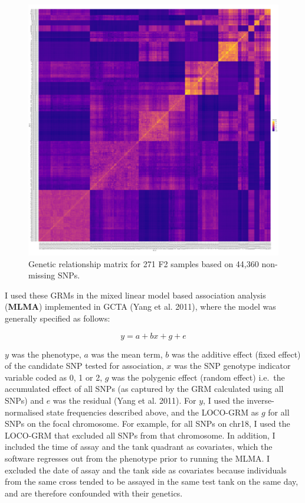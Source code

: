 \documentclass[
]{book}
\begin{document}
\begin{figure}
\includegraphics[width=1\linewidth]{figs/mikk_behaviour/grm_man_0.8} \caption{Genetic relationship matrix for 271 F2 samples based on 44,360 non-missing SNPs.}\label{fig:F2-grm}
\end{figure}

I used these GRMs in the mixed linear model based association analysis (\textbf{MLMA}) implemented in GCTA (Yang et al. 2011), where the model was generally specified as follows:

\[
y = a + bx + g + e
\]

\(y\) was the phenotype, \(a\) was the mean term, \(b\) was the additive effect (fixed effect) of the candidate SNP tested for association, \(x\) was the SNP genotype indicator variable coded as 0, 1 or 2, \(g\) was the polygenic effect (random effect) i.e.~the accumulated effect of all SNPs (as captured by the GRM calculated using all SNPs) and \(e\) was the residual (Yang et al. 2011). For \(y\), I used the inverse-normalised state frequencies described above, and the LOCO-GRM as \(g\) for all SNPs on the focal chromosome. For example, for all SNPs on chr18, I used the LOCO-GRM that excluded all SNPs from that chromosome. In addition, I included the time of assay and the tank quadrant as covariates, which the software regresses out from the phenotype prior to running the MLMA. I excluded the date of assay and the tank side as covariates because individuals from the same cross tended to be assayed in the same test tank on the same day, and are therefore confounded with their genetics.
\end{document}
